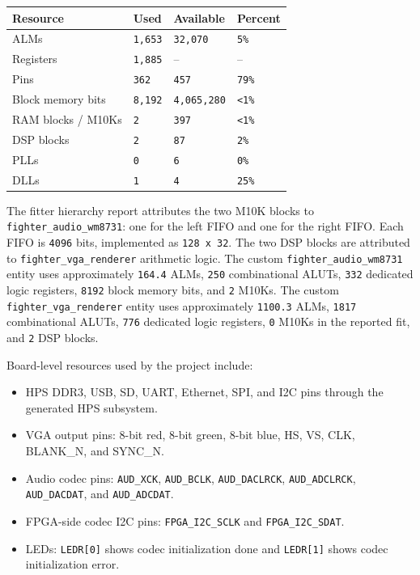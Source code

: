\documentclass[12pt,a4paper]{article}
\begin{document}
\begin{longtable}{>{\raggedright\arraybackslash}p{} >{\raggedright\arraybackslash}p{} >{\raggedright\arraybackslash}p{} >{\raggedright\arraybackslash}p{}}
\toprule
Resource & Used & Available & Percent \\
\midrule
\endhead
ALMs & \texttt{1,653} & \texttt{32,070} & \texttt{5\%} \\
Registers & \texttt{1,885} & -- & -- \\
Pins & \texttt{362} & \texttt{457} & \texttt{79\%} \\
Block memory bits & \texttt{8,192} & \texttt{4,065,280} & \texttt{<1\%} \\
RAM blocks / M10Ks & \texttt{2} & \texttt{397} & \texttt{<1\%} \\
DSP blocks & \texttt{2} & \texttt{87} & \texttt{2\%} \\
PLLs & \texttt{0} & \texttt{6} & \texttt{0\%} \\
DLLs & \texttt{1} & \texttt{4} & \texttt{25\%} \\
\bottomrule
\end{longtable}

The fitter hierarchy report attributes the two M10K blocks to
\texttt{fighter\_audio\_wm8731}: one for the left FIFO and one for the right
FIFO. Each FIFO is \texttt{4096} bits, implemented as \texttt{128 x 32}. The
two DSP blocks are attributed to \texttt{fighter\_vga\_renderer} arithmetic
logic. The custom \texttt{fighter\_audio\_wm8731} entity uses approximately
\texttt{164.4} ALMs, \texttt{250} combinational ALUTs, \texttt{332} dedicated
logic registers, \texttt{8192} block memory bits, and \texttt{2} M10Ks. The
custom \texttt{fighter\_vga\_renderer} entity uses approximately
\texttt{1100.3} ALMs, \texttt{1817} combinational ALUTs, \texttt{776}
dedicated logic registers, \texttt{0} M10Ks in the reported fit, and
\texttt{2} DSP blocks.

Board-level resources used by the project include:

\begin{itemize}
  \item HPS DDR3, USB, SD, UART, Ethernet, SPI, and I2C pins through the
  generated HPS subsystem.
  \item VGA output pins: 8-bit red, 8-bit green, 8-bit blue, HS, VS, CLK,
  BLANK\_N, and SYNC\_N.
  \item Audio codec pins: \texttt{AUD\_XCK}, \texttt{AUD\_BCLK},
  \texttt{AUD\_DACLRCK}, \texttt{AUD\_ADCLRCK}, \texttt{AUD\_DACDAT}, and
  \texttt{AUD\_ADCDAT}.
  \item FPGA-side codec I2C pins: \texttt{FPGA\_I2C\_SCLK} and
  \texttt{FPGA\_I2C\_SDAT}.
  \item LEDs: \texttt{LEDR[0]} shows codec initialization done and
  \texttt{LEDR[1]} shows codec initialization error.
\end{itemize}
\end{document}
